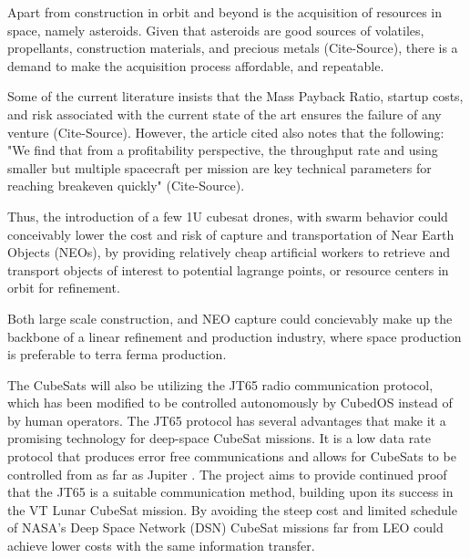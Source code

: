 Apart from construction in orbit and beyond is the acquisition of
resources in space, namely asteroids. Given that asteroids are good
sources of volatiles, propellants, construction materials, and
precious metals (Cite-Source), there is a demand to make the
acquisition process affordable, and repeatable.

Some of the current literature insists that the Mass Payback Ratio,
startup costs, and risk associated with the current state of the art
ensures the failure of any venture (Cite-Source). However, the article
cited also notes that the following: "We find that from a
profitability perspective, the throughput rate and using smaller but
multiple spacecraft per mission are key technical parameters for
reaching breakeven quickly" (Cite-Source).

Thus, the introduction of a few 1U cubesat drones, with swarm behavior
could conceivably lower the cost and risk of capture and
transportation of Near Earth Objects (NEOs), by providing relatively
cheap artificial workers to retrieve and transport objects of interest
to potential lagrange points, or resource centers in orbit for
refinement.

Both large scale construction, and NEO capture could concievably make
up the backbone of a linear refinement and production industry, where
space production is preferable to terra ferma production.

The CubeSats will also be utilizing the JT65 radio communication protocol, which has been modified to be controlled autonomously by CubedOS instead of by human operators. The JT65 protocol has several advantages that make it a promising technology for deep-space CubeSat missions. It is a low data rate protocol that produces error free communications and allows for CubeSats to be controlled from as far as Jupiter \cite{brandon:2019}. The project aims to provide continued proof that the JT65 is a suitable communication method, building upon its success in the VT Lunar CubeSat mission. By avoiding the steep cost and limited schedule of NASA’s Deep Space Network (DSN) CubeSat missions far from LEO could achieve lower costs with the same information transfer.
